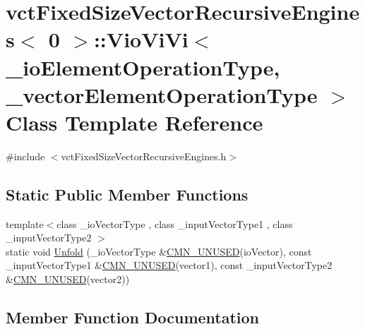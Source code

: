 \hypertarget{classvct_fixed_size_vector_recursive_engines_3_010_01_4_1_1_vio_vi_vi}{}\section{vct\+Fixed\+Size\+Vector\+Recursive\+Engines$<$ 0 $>$\+:\+:Vio\+Vi\+Vi$<$ \+\_\+io\+Element\+Operation\+Type, \+\_\+vector\+Element\+Operation\+Type $>$ Class Template Reference}
\label{classvct_fixed_size_vector_recursive_engines_3_010_01_4_1_1_vio_vi_vi}


{\ttfamily \#include $<$vct\+Fixed\+Size\+Vector\+Recursive\+Engines.\+h$>$}

\subsection*{Static Public Member Functions}
\begin{DoxyCompactItemize}
\item 
{\footnotesize template$<$class \+\_\+io\+Vector\+Type , class \+\_\+input\+Vector\+Type1 , class \+\_\+input\+Vector\+Type2 $>$ }\\static void \hyperlink{classvct_fixed_size_vector_recursive_engines_3_010_01_4_1_1_vio_vi_vi_a3fa8d37bff934b48bf7d5763584a6cb3}{Unfold} (\+\_\+io\+Vector\+Type \&\hyperlink{cmn_portability_8h_a021894e2626935fa2305434b1e893ff6}{C\+M\+N\+\_\+\+U\+N\+U\+S\+E\+D}(io\+Vector), const \+\_\+input\+Vector\+Type1 \&\hyperlink{cmn_portability_8h_a021894e2626935fa2305434b1e893ff6}{C\+M\+N\+\_\+\+U\+N\+U\+S\+E\+D}(vector1), const \+\_\+input\+Vector\+Type2 \&\hyperlink{cmn_portability_8h_a021894e2626935fa2305434b1e893ff6}{C\+M\+N\+\_\+\+U\+N\+U\+S\+E\+D}(vector2))
\end{DoxyCompactItemize}


\subsection{Member Function Documentation}
\hypertarget{classvct_fixed_size_vector_recursive_engines_3_010_01_4_1_1_vio_vi_vi_a3fa8d37bff934b48bf7d5763584a6cb3}{}
